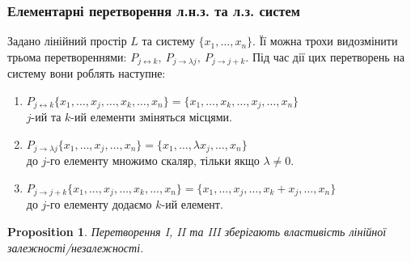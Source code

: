 \documentclass[a4paper, 10pt]{article}
\theoremstyle{theoremdd}
\newtheorem{proposition}[theorem]{Proposition}
\begin{document}
	\subsubsection*{Елементарні перетворення л.н.з. та л.з. систем}
	Задано лінійний простір $L$ та систему $\{x_1, \dots, x_n\}$. Її можна трохи видозмінити трьома перетвореннями: $P_{j \leftrightarrow k},\ P_{j \to \lambda j},\ P_{j \to j+k}$. Під час дії цих перетворень на систему вони роблять наступне:
	\begin{enumerate}[wide = 0pt, label={\Roman*.}]
	\item $P_{j \leftrightarrow k} \{x_1, \dots, x_j, \dots, x_k, \dots, x_n\} = \{x_1, \dots, x_k, \dots, x_j, \dots, x_n\}$\\
	$j$-ий та $k$-ий елементи зміняться місцями.
	\item $P_{j \to \lambda j} \{x_1, \dots, x_j, \dots, x_n\} = \{x_1, \dots, \lambda x_j, \dots, x_n\}$\\
	до $j$-го елементу множимо скаляр, тільки якщо $\lambda \neq 0$.
	\item $P_{j \to j+k} \{x_1, \dots, x_j, \dots, x_k, \dots, x_n\} = \{x_1, \dots, x_j, \dots,  x_k + x_j, \dots, x_n\}$\\
	до $j$-го елементу додаємо $k$-ий елемент.
	\end{enumerate}

	\begin{proposition}
	Перетворення I, II та III зберігають властивість лінійної залежності/незалежності.
	\end{proposition}
	
\end{document}
